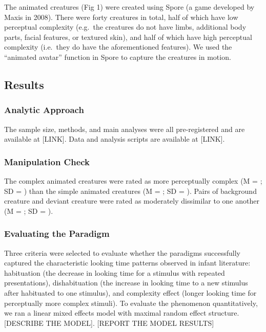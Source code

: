 \documentclass[10pt, letterpaper]{article}
\begin{document}
The animated creatures (Fig 1) were created using Spore (a game
developed by Maxis in 2008). There were forty creatures in total, half
of which have low perceptual complexity (e.g.~the creatures do not have
limbs, additional body parts, facial features, or textured skin), and
half of which have high perceptual complexity (i.e.~they do have the
aforementioned features). We used the ``animated avatar'' function in
Spore to capture the creatures in motion.

\hypertarget{results}{%
\subsection{Results}\label{results}}

\hypertarget{analytic-approach}{%
\subsubsection{Analytic Approach}\label{analytic-approach}}

The sample size, methods, and main analyses were all pre-registered and
are available at {[}LINK{]}. Data and analysis scripts are available at
{[}LINK{]}.

\hypertarget{manipulation-check}{%
\subsubsection{Manipulation Check}\label{manipulation-check}}

The complex animated creatures were rated as more perceptually complex
(M = ; SD = ) than the simple animated creatures (M = ; SD = ). Pairs of
background creature and deviant creature were rated as moderately
dissimilar to one another (M = ; SD = ).

\hypertarget{evaluating-the-paradigm}{%
\subsubsection{Evaluating the Paradigm}\label{evaluating-the-paradigm}}

Three criteria were selected to evaluate whether the paradigms
successfully captured the characteristic looking time patterns observed
in infant literature: habituation (the decrease in looking time for a
stimulus with repeated presentations), dishabituation (the increase in
looking time to a new stimulus after habituated to one stimulus), and
complexity effect (longer looking time for perceptually more complex
stimuli). To evaluate the phenomenon quantitatively, we ran a linear
mixed effects model with maximal random effect structure. {[}DESCRIBE
THE MODEL{]}. {[}REPORT THE MODEL RESULTS{]}
\end{document}
